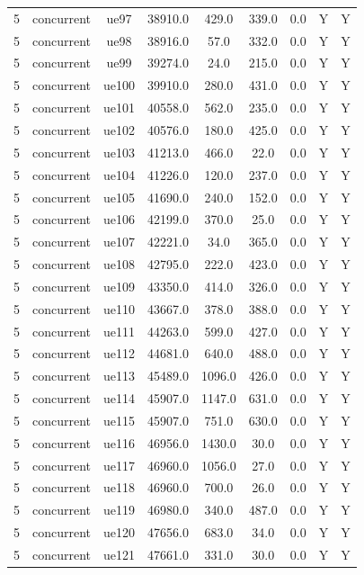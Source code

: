 \begin{table}[ht]
\begin{tabular}{|c|c|c|c|c|c|c|c|c|}
5 & concurrent & ue97 & 38910.0 & 429.0 & 339.0 & 0.0 & Y & Y \\
5 & concurrent & ue98 & 38916.0 & 57.0 & 332.0 & 0.0 & Y & Y \\
5 & concurrent & ue99 & 39274.0 & 24.0 & 215.0 & 0.0 & Y & Y \\
5 & concurrent & ue100 & 39910.0 & 280.0 & 431.0 & 0.0 & Y & Y \\
5 & concurrent & ue101 & 40558.0 & 562.0 & 235.0 & 0.0 & Y & Y \\
5 & concurrent & ue102 & 40576.0 & 180.0 & 425.0 & 0.0 & Y & Y \\
5 & concurrent & ue103 & 41213.0 & 466.0 & 22.0 & 0.0 & Y & Y \\
5 & concurrent & ue104 & 41226.0 & 120.0 & 237.0 & 0.0 & Y & Y \\
5 & concurrent & ue105 & 41690.0 & 240.0 & 152.0 & 0.0 & Y & Y \\
5 & concurrent & ue106 & 42199.0 & 370.0 & 25.0 & 0.0 & Y & Y \\
5 & concurrent & ue107 & 42221.0 & 34.0 & 365.0 & 0.0 & Y & Y \\
5 & concurrent & ue108 & 42795.0 & 222.0 & 423.0 & 0.0 & Y & Y \\
5 & concurrent & ue109 & 43350.0 & 414.0 & 326.0 & 0.0 & Y & Y \\
5 & concurrent & ue110 & 43667.0 & 378.0 & 388.0 & 0.0 & Y & Y \\
5 & concurrent & ue111 & 44263.0 & 599.0 & 427.0 & 0.0 & Y & Y \\
5 & concurrent & ue112 & 44681.0 & 640.0 & 488.0 & 0.0 & Y & Y \\
5 & concurrent & ue113 & 45489.0 & 1096.0 & 426.0 & 0.0 & Y & Y \\
5 & concurrent & ue114 & 45907.0 & 1147.0 & 631.0 & 0.0 & Y & Y \\
5 & concurrent & ue115 & 45907.0 & 751.0 & 630.0 & 0.0 & Y & Y \\
5 & concurrent & ue116 & 46956.0 & 1430.0 & 30.0 & 0.0 & Y & Y \\
5 & concurrent & ue117 & 46960.0 & 1056.0 & 27.0 & 0.0 & Y & Y \\
5 & concurrent & ue118 & 46960.0 & 700.0 & 26.0 & 0.0 & Y & Y \\
5 & concurrent & ue119 & 46980.0 & 340.0 & 487.0 & 0.0 & Y & Y \\
5 & concurrent & ue120 & 47656.0 & 683.0 & 34.0 & 0.0 & Y & Y \\
5 & concurrent & ue121 & 47661.0 & 331.0 & 30.0 & 0.0 & Y & Y \\

\end{tabular}
\end{table}
